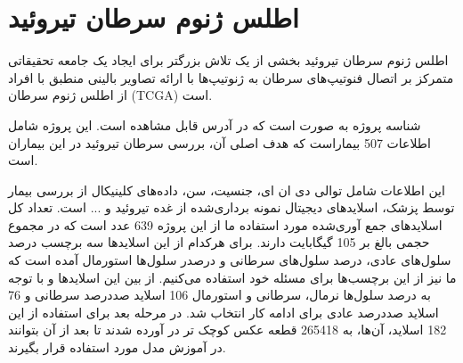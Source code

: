 \section{اطلس ژنوم سرطان تیروئید}\label{subsec:موسسه-ملی-سرطان-پورتال-داده-های-مشترک-ژنومیک}

اطلس ژنوم سرطان تیروئید بخشی از یک تلاش بزرگتر برای ایجاد یک جامعه تحقیقاتی متمرکز بر اتصال فنوتیپ‌های سرطان به ژنوتیپ‌ها با ارائه تصاویر بالینی منطبق با افراد از اطلس ژنوم سرطان (TCGA) است.\cite{clark2013cancer}

شناسه پروژه به صورت  است که در آدرس \cite{ncigdc} قابل مشاهده است. این پروژه شامل اطلاعات 507 بیماراست که هدف اصلی آن، بررسی سرطان تیروئید در این بیماران است.

این اطلاعات شامل توالی دی ان ای، جنسیت، سن، داده‌های کلینیکال از بررسی بیمار توسط پزشک، اسلایدهای دیجیتال نمونه برداری‌شده از غده تیروئید و ... است.
تعداد کل اسلاید‌های جمع آوری‌شده مورد استفاده ما از این پروژه 639 عدد است که در مجموع حجمی بالغ بر 105 گیگابایت دارند. برای هرکدام از این اسلاید‌ها سه برچسب درصد سلول‌های عادی، درصد سلول‌های سرطانی و درصدر سلول‌ها استورمال آمده است که ما نیز از این برچسب‌ها برای مسئله خود استفاده می‌کنیم. از بین این اسلاید‌ها و با توجه به درصد سلول‌ها نرمال، سرطانی و استورمال 106 اسلاید صددرصد سرطانی و 76 اسلاید صددرصد عادی برای ادامه کار انتخاب شد.
در مرحله بعد برای استفاده از این 182 اسلاید، آن‌ها، به 265418 قطعه عکس کوچک تر در آورده شدند تا بعد از آن بتوانند در آموزش مدل مورد استفاده قرار بگیرند.